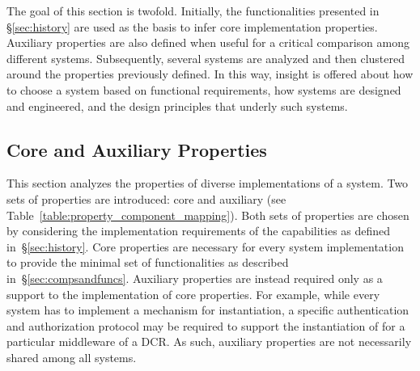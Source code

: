 \documentclass{sig-alternate}
\begin{document}

The goal of this section is twofold. Initially, the \pilot functionalities
presented in \S\ref{sec:history} are used as the basis to infer core \pilot
implementation properties. Auxiliary properties are also defined when useful
for a critical comparison among different \pilot systems. Subsequently, several
\pilot systems are analyzed and then clustered around the properties previously
defined. In this way, insight is offered about how to choose a \pilot system
based on functional requirements, how \pilot systems are designed and
engineered, and the design principles that underly such systems.

 

%
\subsection{Core and Auxiliary Properties}
\label{sec:properties}

This section analyzes the properties of diverse implementations of a \pilot
system. Two sets of properties are introduced: core and auxiliary (see
Table~\ref{table:property_component_mapping}). Both sets of properties are
chosen by considering the implementation requirements of the \pilot capabilities
as defined in~\S\ref{sec:history}. Core properties are necessary for every
\pilot system implementation to provide the minimal set of functionalities as
described in~\S\ref{sec:compsandfuncs}. Auxiliary properties are instead
required only as a support to the implementation of core properties. For
example, while every \pilot system has to implement a mechanism for \pilot
instantiation, a specific authentication and authorization protocol may be
required to support the instantiation of \pilots for a particular middleware of
a DCR. As such, auxiliary properties are not necessarily shared among all \pilot
systems.

\end{document}
